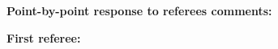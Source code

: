 \documentclass[11pt,a4paper,sans]{moderncv}        %
\begin{document}
  
\medskip
\textbf{Point-by-point response to referees comments:}

\medskip

\textbf{First referee:}

\medskip

\end{document}
